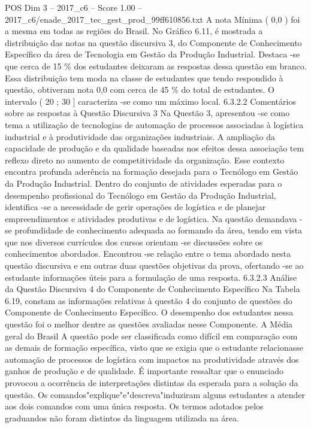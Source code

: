 \begin{textsample}{POS Dim 3 – 2017\_c6 – Score 1.00 – 2017\_c6/enade\_2017\_tec\_gest\_prod\_99ff610856.txt}
A nota Mínima ( 0,0 ) foi a mesma em todas as regiões do Brasil.
No Gráfico 6.11, é mostrada a distribuição das notas na questão discursiva 3, do Componente de Conhecimento Específico da área de Tecnologia em Gestão da Produção Industrial.
Destaca -se que cerca de 15 \% dos estudantes deixaram as respostas dessa questão em branco.
Essa distribuição tem moda na classe de estudantes que tendo respondido à questão, obtiveram nota 0,0 com cerca de 45 \% do total de estudantes.
O intervalo ( 20 ; 30 ] caracteriza -se como um máximo local. 6.3.2.2 Comentários sobre as respostas à Questão Discursiva 3 Na Questão 3, apresentou -se como tema a utilização de tecnologias de automação de processos associadas à logística industrial e à produtividade das organizações industriais.
A ampliação da capacidade de produção e da qualidade baseadas nos efeitos dessa associação tem reflexo direto no aumento de competitividade da organização.
Esse contexto encontra profunda aderência na formação desejada para o Tecnólogo em Gestão da Produção Industrial.
Dentro do conjunto de atividades esperadas para o desempenho profissional do Tecnólogo em Gestão da Produção Industrial, identifica -se a necessidade de gerir operações de logística e de planejar empreendimentos e atividades produtivas e de logística.
Na questão demandava -se profundidade de conhecimento adequada ao formando da área, tendo em vista que nos diversos currículos dos cursos orientam -se discussões sobre os conhecimentos abordados.
Encontrou -se relação entre o tema abordado nesta questão discursiva e em outras duas questões objetivas da prova, ofertando -se ao estudante informações úteis para a formulação de uma resposta. 6.3.2.3 Análise da Questão Discursiva 4 do Componente de Conhecimento Específico Na Tabela 6.19, constam as informações relativas à questão 4 do conjunto de questões do Componente de Conhecimento Específico.
O desempenho dos estudantes nessa questão foi o melhor dentre as questões avaliadas nesse Componente.
A Média geral do Brasil A questão pode ser classificada como difícil em comparação com as demais de formação específica, visto que se exigia que o estudante relacionasse automação de processos de logística com impactos na produtividade através dos ganhos de produção e de qualidade.
É importante ressaltar que o enunciado provocou a ocorrência de interpretações distintas da esperada para a solução da questão.
Os comandos"explique"e"descreva"induziram alguns estudantes a atender aos dois comandos com uma única resposta.
Os termos adotados pelos graduandos não foram distintos da linguagem utilizada na área.

\end{textsample}
